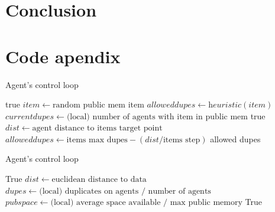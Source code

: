 \documentclass{UoYCSproject}
\begin{document}


\chapter{Conclusion}
\label{cha:conclusion}


\appendix
\chapter{Code apendix}

\begin{algorithm}
\caption{Agent's control loop}
\label{Agent_Control_Loop}
\begin{algorithmic}[1]
\State {}
\State
{}
\State {}
\State \Return true
\EndIf
\State
\State $item \gets \text{random public mem item}$
\State $allowed dupes \gets \textit{heuristic}(item)$
\State $current dupes \gets \text{(local) number of agents with item in public mem}$
\State
{}
\State {}
\State {}
\Else
\State {}
\EndIf
\State
\State \Return true
\EndProcedure
\State
{}
\State $dist  \gets \text{agent distance to items target point}$
\State $allowed dupes \gets \text{items max dupes} - (dist / \text{items step})$
\State
{}
\State {}
\Else
\State \Return allowed dupes
\EndIf
\EndProcedure
\end{algorithmic}
\end{algorithm}


\begin{algorithm}
\caption{Agent's control loop}
\label{Agent_Control_Loop2}
\begin{algorithmic}[1]
\State {}
\State
{}
\State {}
\State \Return True
\EndIf
\State
\State $dist \gets \text{euclidean distance to data}$
\State $dupes \gets \text{(local) duplicates on agents / number of agents}$
\State $pub space \gets \text{(local) average space available / max public memory}$
\State
{}
\State {}
\EndIf
\State
{}
\State {}
\EndIf
\State
\State {}
\State
\State \Return True
\EndProcedure
\end{algorithmic}
\end{algorithm}
\end{document}
